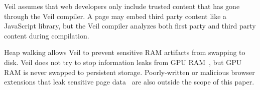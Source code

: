Veil assumes that web developers only include
trusted content that has gone through the Veil
compiler.
A page may embed third party content like a JavaScript
library, but the Veil compiler analyzes both
first party and third party content during compilation.

Heap walking allows Veil
to prevent sensitive RAM artifacts from swapping to
disk. Veil does not try to stop information
leaks from GPU RAM~\cite{lee2014}, but GPU RAM
is never swapped to persistent storage. 
Poorly-written or malicious browser extensions that leak
sensitive page data~\cite{lerner13} are also outside the
scope of this paper.
